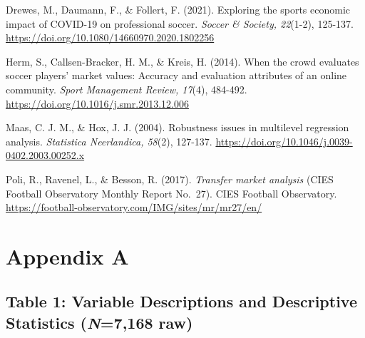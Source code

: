 \documentclass[
  12pt,
]{article}
\begin{document}
Drewes, M., Daumann, F., \& Follert, F. (2021). Exploring the sports
economic impact of COVID-19 on professional soccer. \emph{Soccer \&
Society, 22}(1-2), 125-137.
\url{https://doi.org/10.1080/14660970.2020.1802256}

Herm, S., Callsen-Bracker, H. M., \& Kreis, H. (2014). When the crowd
evaluates soccer players' market values: Accuracy and evaluation
attributes of an online community. \emph{Sport Management Review,
17}(4), 484-492. \url{https://doi.org/10.1016/j.smr.2013.12.006}

Maas, C. J. M., \& Hox, J. J. (2004). Robustness issues in multilevel
regression analysis. \emph{Statistica Neerlandica, 58}(2), 127-137.
\url{https://doi.org/10.1046/j.0039-0402.2003.00252.x}

Poli, R., Ravenel, L., \& Besson, R. (2017). \emph{Transfer market
analysis} (CIES Football Observatory Monthly Report No.~27). CIES
Football Observatory.
\url{https://football-observatory.com/IMG/sites/mr/mr27/en/}

\clearpage

\newpage

\section{Appendix A}\label{appendix-a}

\subsection*{\texorpdfstring{Table 1: Variable Descriptions and
Descriptive Statistics (\emph{N}=7,168
raw)}{Table 1: Variable Descriptions and Descriptive Statistics (N=7,168 raw)}}\label{table-1-variable-descriptions-and-descriptive-statistics-n7168-raw}
\end{document}
